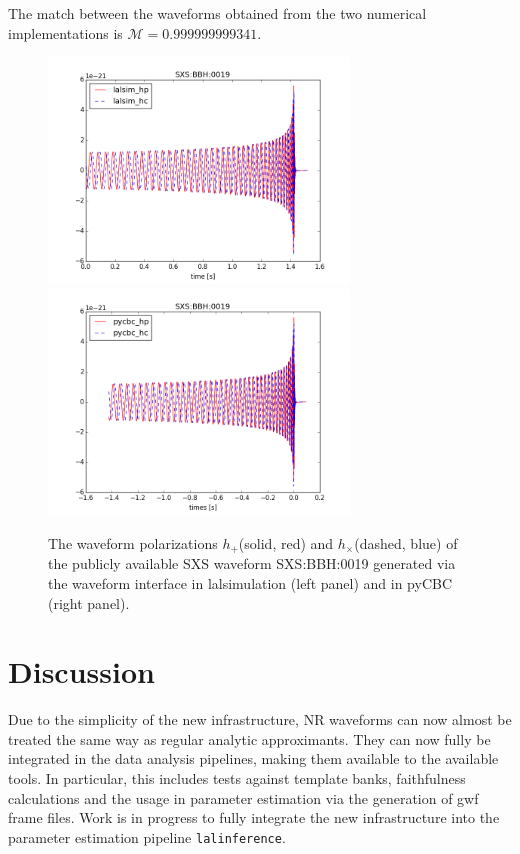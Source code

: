 \documentclass[aps,prd,amssymb,amsmath,amsfonts,superscriptaddress,
floatfix ,preprintnumbers,altaffilletter]{revtex4}
\begin{document}
The match between the waveforms obtained from the two numerical implementations is $\mathcal{M}=0.999999999341$.
\begin{figure}
\begin{center}
\includegraphics[width=80mm]{lalsim_TD_0019.png}
\includegraphics[width=80mm]{pycbc_TD_0019.png}
\caption{The waveform polarizations $h_+$(solid, red) and $h_\times$(dashed, blue) of the publicly available SXS waveform SXS:BBH:0019 
generated via the waveform interface in lalsimulation (left panel) and in pyCBC (right panel).}
\label{fig:waveforms}
\end{center}
\end{figure}


\section{Discussion}
\label{sec:discussion}
Due to the simplicity of the new infrastructure, NR waveforms can now almost be treated the same way as 
regular analytic approximants. They can now fully be integrated in the data analysis pipelines, making them
available to the available tools. In particular, this includes tests against template banks, faithfulness calculations
and the usage in parameter estimation via the generation of gwf frame files. Work is in progress to fully integrate
the new infrastructure into the parameter estimation pipeline \texttt{lalinference}.
\end{document}
